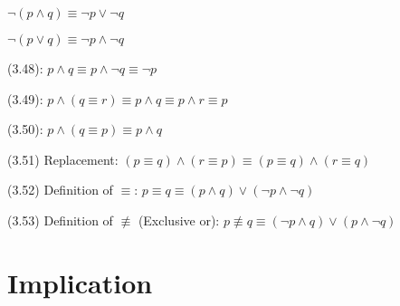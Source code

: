 \documentclass[a4paper,10pt]{article}
\newenvironment{theoremlist}{
\begin{description}
  \setlength{\itemsep}{1.5pt}
  \setlength{\parskip}{0pt}
  \setlength{\parsep}{0pt}
}{\end{description}}
\begin{document}
\begin{theoremlist}
  \begin{theoremlist}
  \item %
  \item										$ \lnot(p \land q) \equiv \lnot p \lor \lnot q $
  \item 									$ \lnot(p \lor q) \equiv \lnot p \land \lnot q $
  \end{theoremlist}      
\item[(3.48):]									$ p \land q \equiv p \land \lnot q \equiv \lnot p $
\item[(3.49):]									$ p \land (q \equiv r) \equiv p \land q \equiv p \land r \equiv p $
\item[(3.50):]									$ p \land (q \equiv p) \equiv p \land q	$
\item[(3.51) Replacement:]							$ (p \equiv q ) \land (r \equiv p) \equiv (p \equiv q) \land (r \equiv q) $
\item[(3.52) Definition of $\equiv$:]						$ p \equiv q \equiv (p \land q) \lor (\lnot p \land \lnot q) $
\item[(3.53) Definition of $\nequiv$ (Exclusive or):]				$ p \nequiv q \equiv (\lnot p \land q) \lor (p \land \lnot q) $
\end{theoremlist}


\section{Implication}
\end{document}
